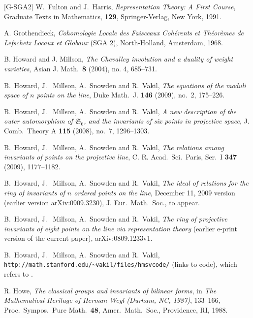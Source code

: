 \documentclass{amsart}
\theoremstyle{definition}
\theoremstyle{remark}
\def\SS{\mathfrak{S}}
\begin{document}
\begin{thebibliography}{[G-SGA2]}
W.\ Fulton and J.\ Harris, \emph{Representation Theory: A First Course},
Graduate Texts in Mathematics, {\bf 129}, Springer-Verlag, New York, 1991.

  A. Grothendieck, {\em Cohomologie Locale des
    Faisceaux Coh\'erents et Th\'eor\`emes de Lefschetz Locaux
      et Globaux} (SGA 2), North-Holland, Amsterdam, 1968.

  B. Howard and J. Millson, {\em The Chevalley
    involution and a duality of weight varieties},  Asian J. Math.\
  {\bf  8}  (2004),  no. 4, 685--731.


B.\ Howard, J. \ Millson, A.\ Snowden and R.\ Vakil, {\em The equations of the
moduli space of $n$ points on the line}, Duke Math.\ J. {\bf 146}
(2009), no.\ 2, 175--226.

B.\ Howard, J. \ Millson, A.\ Snowden and R.\ Vakil, {\em A new description of
the outer automorphism of $\SS_6$, and the invariants of six points in projective
space}, J. Comb.\ Theory A {\bf 115} (2008), no.\ 7, 1296--1303.

B.\ Howard, J. \ Millson, A.\ Snowden and R.\ Vakil, {\em The
  relations among invariants of points on the projective line},
C. R. Acad.\ Sci.\ Paris, Ser.\ I {\bf 347} (2009), 1177--1182.

B.\ Howard, J. \ Millson, A.\ Snowden and R.\ Vakil, {\em The ideal of
  relations for the ring of 
invariants of $n$ ordered points on the line},
December 11, 2009 version (earlier version arXiv:0909.3230), J. Eur.\
Math.\ Soc., to appear.

B.\ Howard, J. \ Millson, A.\ Snowden and R.\ Vakil, {\em The ring of
  projective invariants of eight points on the line via representation
  theory} (earlier e-print version of the current paper), arXiv:0809.1233v1.

\bibitem[HMSV6]{hmsvcode} 
B.\ Howard, J. \ Millson, A.\ Snowden and R.\ Vakil,
\verb+http://math.stanford.edu/~vakil/files/hmsvcode/+ (links to
code), which refers to \cite{S}.

 R. Howe, {\em The classical groups and invariants
of bilinear forms}, in {\em The Mathematical Heritage of Herman Weyl
(Durham, NC, 1987)}, 133--166, Proc.\ Sympos.\ Pure Math.\ {\bf 48},
Amer.\ Math.\ Soc., Providence, RI, 1988.


\end{thebibliography}
\end{document}

